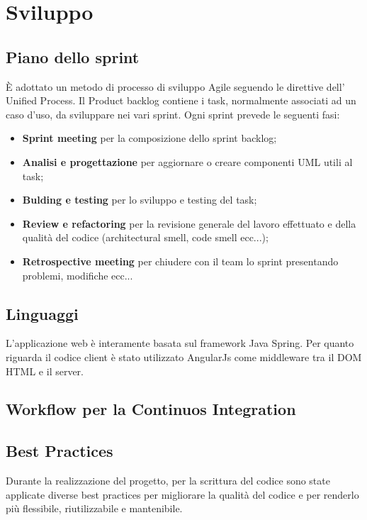 \documentclass[12pt]{article}
\begin{document}
\section{Sviluppo}
\subsection{Piano dello sprint}
\`{E} adottato un metodo di processo di sviluppo Agile seguendo le direttive dell' Unified Process. Il Product backlog contiene i task, normalmente associati ad un caso d'uso,  da sviluppare nei vari sprint. Ogni sprint prevede le seguenti fasi:
\begin{itemize}
\item {\textbf {Sprint meeting}} per la composizione dello sprint backlog;
\item {\textbf {Analisi e progettazione}}  per aggiornare o creare componenti UML utili al task;
\item {\textbf {Bulding e testing}}  per lo sviluppo e testing del task;
\item {\textbf {Review e refactoring}} per la revisione generale del lavoro effettuato e della qualità del codice (architectural smell, code smell ecc...);
\item {\textbf {Retrospective meeting}} per chiudere con il team lo sprint presentando problemi, modifiche ecc...

\end{itemize}

\subsection{Linguaggi}
L'applicazione web è interamente basata sul framework Java Spring. Per quanto riguarda il codice client è stato utilizzato AngularJs come middleware tra il DOM HTML e il server.

\subsection{Workflow per la Continuos Integration}
\subsection{Best Practices}
Durante la realizzazione del progetto, per la scrittura del codice sono state applicate diverse best practices per migliorare la qualità del codice e per renderlo più flessibile, riutilizzabile e mantenibile.
\end{document}
